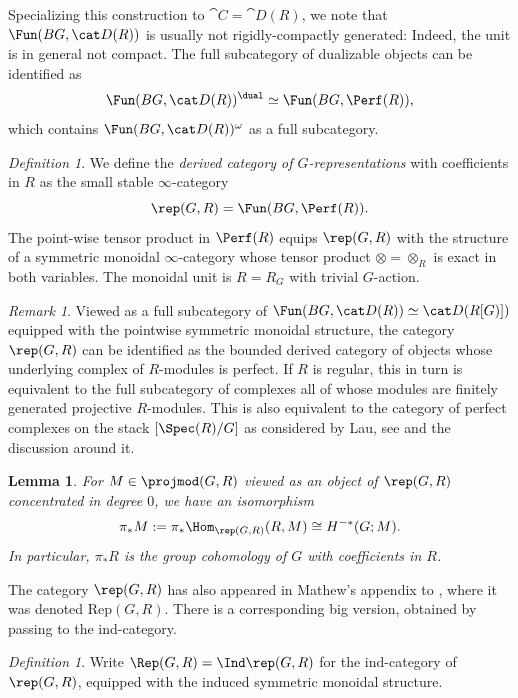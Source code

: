 \documentclass{amsart}%
\numberwithin{equation}{section}%
\newtheorem{Lem}[equation]{Lemma}
\theoremstyle{remark}
\newtheorem{Def}[equation]{Definition}
\newtheorem{Rem}[equation]{Remark}
\begin{document}
Specializing this construction to $\cat C = \cat D(R)$, we note that $\Fun(BG,\cat D(R))$ is usually not rigidly-compactly generated: Indeed, the unit is in general not compact. The full subcategory of dualizable objects can be identified as
\[
\Fun(BG,\cat D(R))^{\dual} \simeq \Fun(BG,\Perf(R)),
\]
which contains $\Fun(BG,\cat D(R))^{\omega}$ as a full subcategory.

\begin{Def}
We define the \emph{derived category of $G$-representations} with coefficients in $R$ as the small stable $\infty$-category
\[
\rep(G,R) = \Fun(BG,\Perf(R)).
\]
The point-wise tensor product in $\Perf(R)$ equips $\rep(G,R)$ with the structure of a symmetric monoidal $\infty$-category whose tensor product $\otimes = \otimes_R$ is exact in both variables. The monoidal unit is $R = R_G$ with trivial $G$-action.
\end{Def}

\begin{Rem}\label{rem:repmodels}
Viewed as a full subcategory of $\Fun(BG,\cat D(R)) \simeq \cat D(R[G)])$
equipped with the pointwise symmetric monoidal structure, the category $\rep(G,R)$ can be identified as the bounded derived category of objects whose underlying complex of $R$-modules is perfect. If $R$ is regular, this in turn is equivalent to the full subcategory of complexes all of whose modules are finitely generated projective $R$-modules. This is also equivalent to the category of perfect complexes on the stack $[\Spec(R)/G]$ as considered by Lau, see \cite[Prop.~3.1]{lau_spcdmstacks} and the discussion around it. 
\end{Rem}

\begin{Lem}
For $M \in \projmod(G,R)$ viewed as an object of $\rep(G,R)$ concentrated in degree $0$, we have an isomorphism
\[
\pi_*M := \pi_*\Hom_{\rep(G,R)}(R,M) \cong H^{-*}(G;M).
\]
In particular, $\pi_*R$ is the group cohomology of $G$ with coefficients in $R$.
\end{Lem}

The category $\rep(G,R)$ has also appeared in Mathew's appendix to \cite{treumannmathew_reps}, where it was denoted $\mathrm{Rep}(G,R)$. There is a corresponding big version, obtained by passing to the ind-category.

\begin{Def}\label{def:Rep}
Write $\Rep(G,R) = \Ind\rep(G,R)$ for the ind-category of $\rep(G,R)$, equipped with the induced symmetric monoidal structure. 
\end{Def}
\end{document}
